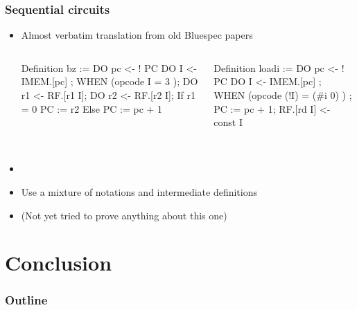 \documentclass[9pt]{beamer}
\begin{document}
\begin{frame}[fragile]
  \frametitle{Sequential circuits}
  \begin{itemize}
  \item Almost verbatim translation from old Bluespec papers
    \begin{columns}
      \begin{coq}
Definition bz :=
DO pc <- ! PC 
DO I   <- IMEM.[pc] ; 
WHEN (opcode I =  3 );
DO r1 <- RF.[r1 I];
DO r2 <- RF.[r2 I];
If  r1 = 0 { PC := r2 }
Else {PC := pc + 1}
\end{coq}

\begin{coq}
Definition loadi  :=
DO pc <- ! PC 
DO I   <- IMEM.[pc] ; 
WHEN (opcode (!I) =  (#i 0) ) ; 
PC := pc + 1;
RF.[rd I] <- const I 

$ $
\end{coq}
\end{columns}

\item {}
\item Use a mixture of notations and intermediate definitions
\item (Not yet tried to prove anything about this one)
\end{itemize}
\end{frame}

\section{Conclusion}
\begin{frame}
  \frametitle{Outline}       
  \tableofcontents [currentsection] 
\end{frame}
\end{document}

